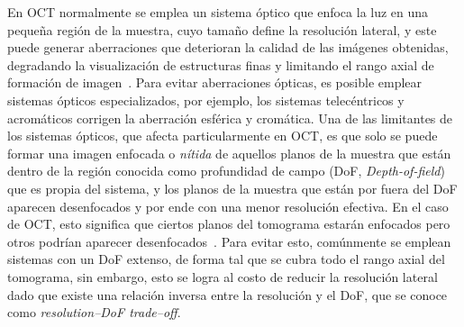 \documentclass[letter, 12 pt]{article}
\begin{document}
En OCT normalmente se emplea un sistema óptico que enfoca la luz en una pequeña región de la muestra, cuyo tamaño define la resolución lateral, y este puede generar aberraciones que deterioran la calidad de las imágenes obtenidas, degradando la visualización de estructuras finas y limitando el rango axial de formación de imagen~\cite{drexler2015}. Para evitar aberraciones ópticas, es posible emplear sistemas ópticos especializados, por ejemplo, los sistemas telecéntricos y acromáticos corrigen la aberración esférica y cromática. Una de las limitantes de los sistemas ópticos, que afecta particularmente en OCT, es que solo se puede formar una imagen enfocada o \textit{nítida} de aquellos planos de la muestra que están dentro de la región conocida como profundidad de campo (DoF, \textit{Depth-of-field}) que es propia del sistema, y los planos de la muestra que están por fuera del DoF aparecen desenfocados y por ende con una menor resolución efectiva. En el caso de OCT, esto significa que ciertos planos del tomograma estarán enfocados pero otros podrían aparecer desenfocados~\cite{drexler2015}. Para evitar esto, comúnmente se emplean sistemas con un DoF extenso, de forma tal que se cubra todo el rango axial del tomograma, sin embargo, esto se logra al costo de reducir la resolución lateral dado que existe una relación inversa entre la resolución y el DoF, que se conoce como \textit{resolution--DoF trade--off}. \\
\end{document}
